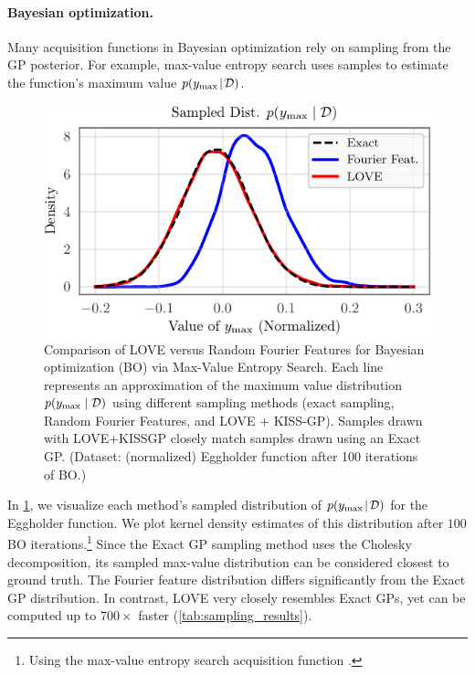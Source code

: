 \paragraph{Bayesian optimization.}
Many acquisition functions in Bayesian optimization rely on sampling from the GP posterior.
For example, max-value entropy search \cite{wang2017max} uses samples to estimate the function's maximum value $p(y_\text{max} \! \mid \! \mathcal D)$.
%
\begin{figure}[t!]
  \centering
  \includegraphics[width=0.65\columnwidth]{figures/love_sampling_comparison.pdf}
  \caption[Comparison of LOVE versus Random Fourier Features for Bayesian optimization via Max-Value Entropy Search.]{
    Comparison of LOVE versus Random Fourier Features for Bayesian optimization (BO) via Max-Value Entropy Search.
    Each line represents an approximation of the maximum value distribution $p(y_\text{max} \mid \mathcal D)$ using different sampling methods (exact sampling, Random Fourier Features, and LOVE + KISS-GP).
    Samples drawn with LOVE+KISSGP closely match samples drawn using an Exact GP.
    (Dataset: (normalized) Eggholder function after 100 iterations of BO.)
    \label{fig:love_sampling_comparison}
  }
\end{figure}
%
In \cref{fig:love_sampling_comparison}, we visualize each method's sampled distribution of $p(y_\text{max} \! \mid \! \mathcal D)$ for the Eggholder function.
We plot kernel density estimates of this distribution after $100$ BO iterations.\footnote{
  Using the max-value entropy search acquisition function \citep{wang2017max}.
}
Since the Exact GP sampling method uses the Cholesky decomposition, its sampled max-value distribution can be considered closest to ground truth.
The Fourier feature distribution differs significantly from the Exact GP distribution.
In contrast, LOVE{} very closely resembles Exact GPs, yet can be computed up to $700 \times$ faster (\cref{tab:sampling_results}).
